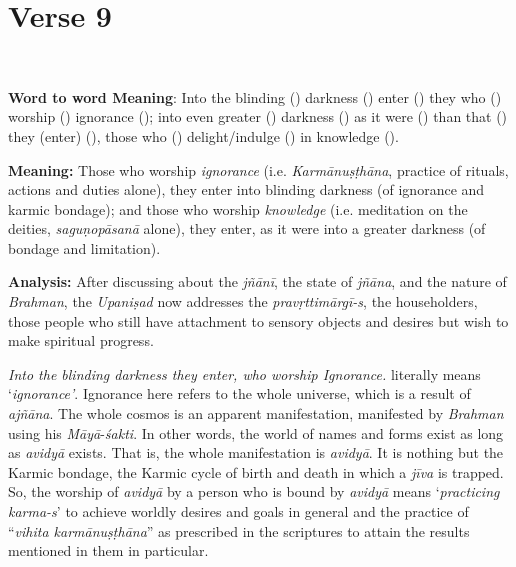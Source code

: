 \chapter{Verse 9}

\begin{moolashloka}
\\
\end{moolashloka}


\textbf{Word to word Meaning}: Into the blinding () darkness () enter () they who () worship () ignorance (); into even greater () darkness () as it were () than that () they (enter) (), those who () delight/indulge () in knowledge ().

\textbf{Meaning:} Those who worship \emph{ignorance} (i.e. \emph{Karmānuṣṭhāna}, practice of rituals, actions and duties alone), they enter into blinding darkness (of ignorance and karmic bondage); and those who worship \emph{knowledge} (i.e. meditation on the deities, \emph{saguṇopāsanā} alone), they enter, as it were into a greater darkness (of bondage and limitation).

\textbf{Analysis:} After discussing about the \emph{jñānī}, the state of \emph{jñāna}, and the nature of \emph{Brahman}, the \emph{Upaniṣad} now addresses the \emph{pravṛttimārgī-s}, the householders, those people who still have attachment to sensory objects and desires but wish to make spiritual progress.

 \emph{Into the blinding darkness they enter, who worship Ignorance.}  literally means `\emph{ignorance'}. Ignorance here refers to the whole universe, which is a result of \emph{ajñāna}. The whole cosmos is an apparent manifestation, manifested by \emph{Brahman} using his \emph{Māyā}-\emph{śakti}. In other words, the world of names and forms exist as long as \emph{avidyā} exists. That is, the whole manifestation is \emph{avidyā}. It is nothing but the Karmic bondage, the Karmic cycle of birth and death in which a \emph{jīva} is trapped. So, the worship of \emph{avidyā} by a person who is bound by \emph{avidyā} means `\emph{practicing karma-s}' to achieve worldly desires and goals in general and the practice of ``\emph{vihita karmānuṣṭhāna}'' as prescribed in the scriptures to attain the results mentioned in them in particular.

